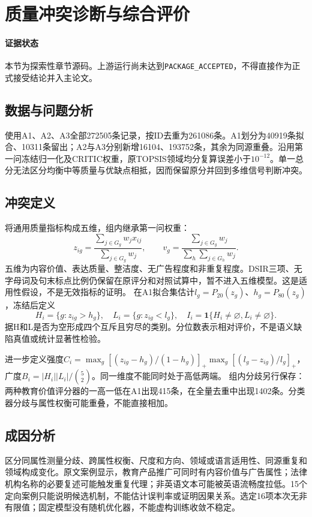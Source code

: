 \section{质量冲突诊断与综合评价}
\label{sec:q12-conflict}
\paragraph{证据状态}本节为探索性章节源码。上游运行尚未达到\texttt{PACKAGE\_ACCEPTED}，不得直接作为正式接受结论并入主论文。
\subsection{数据与问题分析}
使用A1、A2、A3全部272505条记录，按ID去重为261086条。A1划分为40919条拟合、10311条留出；A2与A3分别新增16104、193752条，其余为同源重叠。沿用第一问冻结归一化及CRITIC权重，原TOPSIS领域均分复算误差小于$10^{-12}$。单一总分无法区分均衡中等质量与优缺点相抵，因而保留原分并回到多维信号判断冲突。
\subsection{冲突定义}
将通用质量指标构成五维，组内继承第一问权重：
\begin{equation}
z_{ig}=\frac{\sum_{j\in G_g}w_jx_{ij}}{\sum_{j\in G_g}w_j},\qquad
v_g=\frac{\sum_{j\in G_g}w_j}{\sum_h\sum_{j\in G_h}w_j}.
\label{eq:q12-group}
\end{equation}
五维为内容价值、表达质量、整洁度、无广告程度和非重复程度。DSIR三项、无字母词及句末标点比例仍保留在原评分和对照试算中，暂不进入五维模型。这是适用性假设，不是无效指标的证明。
在A1拟合集估计$l_g=P_{20}(z_g)$、$h_g=P_{80}(z_g)$，冻结后定义
\begin{equation}
H_i=\{g:z_{ig}>h_g\},\quad L_i=\{g:z_{ig}<l_g\},\quad
I_i=\mathbf1\{H_i\ne\varnothing,L_i\ne\varnothing\}.
\label{eq:q12-conflict}
\end{equation}
据H和L是否为空形成四个互斥且穷尽的类别。分位数表示相对评价，不是语义缺陷真值或统计显著性检验。

进一步定义强度$C_i=\max_g[(z_{ig}-h_g)/(1-h_g)]_+\max_g[(l_g-z_{ig})/l_g]_+$，广度$B_i=|H_i||L_i|/\binom52$。同一维度不能同时处于高低两端。
组内分歧另行保存：两种教育价值评分器的一高一低在A1出现415条，在全量去重中出现1402条。分类器分歧与属性权衡可能重叠，不能直接相加。
\subsection{成因分析}
区分同属性测量分歧、跨属性权衡、尺度和方向、领域或语言适用性、同源重复和领域构成变化。原文案例显示，教育产品推广可同时有内容价值与广告属性；法律机构名称的必要复述可能触发重复代理；非英语文本可能被英语流畅度拉低。15个定向案例只能说明候选机制，不能估计误判率或证明因果关系。选定16项本次无非有限值；固定模型没有随机优化器，不能虚构训练收敛不稳定。
